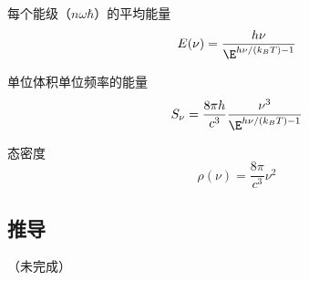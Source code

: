 
每个能级（$n\omega\hbar$）的平均能量
\begin{equation}
E(\nu) = \frac{h\nu}{\E^{h\nu/(k_B T) - 1}}
\end{equation}

单位体积单位频率的能量
\begin{equation}
S_\nu = \frac{8\pi h}{c^3}\frac{\nu^3}{\E^{h\nu/(k_B T) - 1}}
\end{equation}

态密度
\begin{equation}
\rho(\nu) = \frac{8\pi}{c^3}\nu^2
\end{equation}

\subsection{推导}
（未完成）
